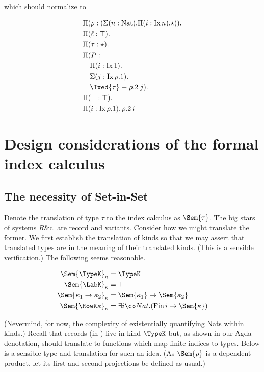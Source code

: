 \documentclass[12pt]{article}
\newcommand\Nat{\mathrm{Nat}}
\newcommand\Fin{\mathrm{Fin}}
\newcommand\Ix[1]{\mathrm{Ix} \, #1}
\begin{document}
which should normalize to

\begin{align*}
&\Pi (\rho : (\Sigma (n : \Nat). \Pi (i : \Ix n). \star)).\\ 
&\Pi (\ell : \top). \\
&\Pi (\tau : \star). \\
&\Pi (P :      \\
&\quad \Pi (i : \Ix 1). \\
&\quad      \Sigma (j : \Ix {\rho.1}).  \\
&\quad       \Ixed{\tau} \equiv {\rho}.2 \; j). \\
&\Pi (\_ : \top). \\
&\Pi (i : \Ix {\rho.1}). \, \rho.2 \, i 
\end{align*}

\section{Design considerations of the formal index calculus}

\subsection{The necessity of Set-in-Set}

Denote the translation of \RO type $\tau$ to the index calculus as $\Sem{\tau}$. The big stars of systems $R$\&c. are record and variants. Consider how we might translate the former. We first establish the translation of kinds so that we may assert that translated types are in the meaning of their translated kinds. (This is a sensible verification.) The following seems reasonable.

\begin{align*}
  \Sem{\TypeK}_\kappa &= \TypeK \\
  \Sem{\LabK}_\kappa &= \top \\
  \Sem{\kappa_1 \to \kappa_2}_\kappa &= \Sem{\kappa_1} \to \Sem{\kappa_2} \\
  \Sem{\RowK \kappa}_\kappa &= \exists i \co Nat. (\Fin \, i \to \Sem{\kappa}) \\
\end{align*}

(Nevermind, for now, the complexity of existentially quantifying Nats within kinds.) Recall that records (in \RO) live in kind $\TypeK$ but, as shown in our Agda denotation, should translate to functions which map finite indices to types. Below is a sensible type and translation for such an idea. (As $\Sem{\rho}$ is a dependent product, let its first and second projections be defined as usual.)
\end{document}
